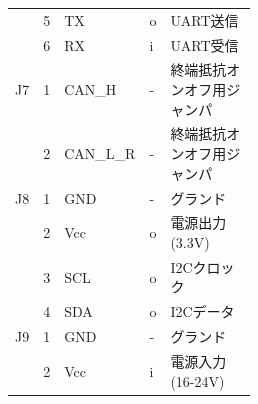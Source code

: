 \documentclass[autodetect-engine,11pt,a4paper,ja=standard]{bxjsarticle}
\begin{document}
\begin{longtable}{@{}l l l l p{0.48\linewidth}@{}}
~ & 5 & TX & o & UART送信 \\
~ & 6 & RX & i & UART受信 \\
\midrule
J7 & 1 & CAN\_H & - & 終端抵抗オンオフ用ジャンパ \\
~ & 2 & CAN\_L\_R & - & 終端抵抗オンオフ用ジャンパ \\
\midrule
J8 & 1 & GND & - & グランド \\
~ & 2 & Vcc & o & 電源出力(3.3V) \\
~ & 3 & SCL & o & I2Cクロック \\
~ & 4 & SDA & o & I2Cデータ \\
\midrule
J9 & 1 & GND & - & グランド \\
~ & 2 & Vcc & i & 電源入力(16-24V) \\
\end{longtable}
\end{document}
